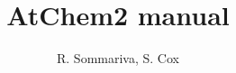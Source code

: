 \documentclass[11pt,a4paper]{report}
\title{AtChem2 manual}
\author{R. Sommariva, S. Cox}
\date{}
\begin{document}
\maketitle
\linenumbers






















\end{document}
